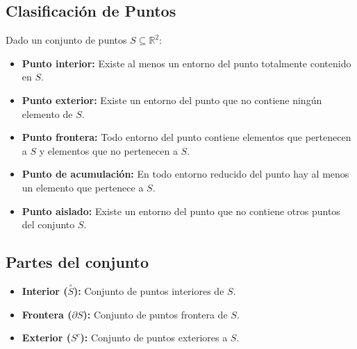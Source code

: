 \documentclass[a4paper,12pt]{article}
\begin{document}
\subsection{Clasificación de Puntos}
Dado un conjunto de puntos $S \subseteq \mathbb{R}^2$:
\begin{itemize}
    \item \textbf{Punto interior:} Existe al menos un entorno del punto totalmente contenido en $S$.
    \item \textbf{Punto exterior:} Existe un entorno del punto que no contiene ningún elemento de $S$.
    \item \textbf{Punto frontera:} Todo entorno del punto contiene elementos que pertenecen a $S$ y elementos que no pertenecen a $S$.
    \item \textbf{Punto de acumulación:} En todo entorno reducido del punto hay al menos un elemento que pertenece a $S$.
    \item \textbf{Punto aislado:} Existe un entorno del punto que no contiene otros puntos del conjunto $S$.
\end{itemize}

\subsection{Partes del conjunto}
\begin{itemize}
    \item \textbf{Interior ($\overset{\circ}{S}$):} Conjunto de puntos interiores de $S$.
    \item \textbf{Frontera ($\partial S$):} Conjunto de puntos frontera de $S$.
    \item \textbf{Exterior ($S^c$):} Conjunto de puntos exteriores a $S$.
\end{itemize}
\end{document}
